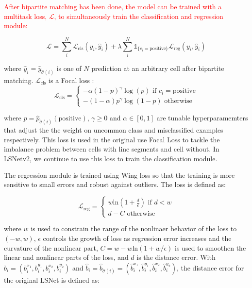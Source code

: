 \documentclass[journal]{IEEEtran}
\begin{document}
\textcolor{red}{After bipartite matching has been done, the model can be trained with a multitask loss, $\mathcal{L}$, to simultaneously train the classification and regression module:}

\begin{equation} \label{multitask_training_loss}
\mathcal{L} = \sum_i^N\mathcal{L}_{\text{cls}}(y_i, \hat{y}_i) + \lambda \sum_i^N\mathds{1}_{\{c_i=\text{positive}\}}\mathcal{L}_\text{reg}(y_i, \hat{y}_i) 
\end{equation}

where $\hat{y}_i = \hat{y}_{\hat{\sigma}(i)}$ is one of $N$ prediction at an arbitrary cell after bipartite matching. $\mathcal{L}_{\text{cls}}$ is a Focal loss \cite{focal_loss}:
\begin{equation}
  \mathcal{L}_{\text{cls}} =
    \begin{cases}
      -\alpha (1 - p)^\gamma \log(p) \text{  if  } c_i=\text{positive} \\
      -(1 - \alpha)p^\gamma \log(1-p) \text{  otherwise} 
    \end{cases}       
\end{equation}

where $p=\hat{p}_{\hat{\sigma}(i)}(\text{positive})$, $\gamma \geq 0$ and $\alpha \in [0, 1]$ are tunable hyperparamemters that adjust the the weight on uncommon class and misclassified examples respectively. This loss is used in the original use Focal Loss to tackle the imbalance problem between cells with line segments and cell without. In LSNetv2, we continue to use this loss to train the classification module.

The regression module is trained using Wing loss \cite{wing_loss} so that the training is more sensitive to small errors and robust against outliers. The loss is defined as:

\begin{equation}
  \mathcal{L}_{\text{reg}} =
    \begin{cases}
      w \text{ln} (1 + \frac{d}{\epsilon}) \text{ if } d < w \\
      d - C \text{  otherwise}
    \end{cases}       
\end{equation}

where $w$ is used to constrain the range of the nonlinaer behavior of the loss to $(-w, w)$, $\epsilon$ controls the growth of loss as regression error increases and the curvature of the nonlinear part, $C = w - w\text{ln}(1 + w / \epsilon)$ is used to smoothen the linear and nonlinear parts of the loss, and $d$ is the distance error. With $b_i = (b_i^{x_1}, b_i^{y_1}, b_i^{x_2}, b_i^{y_2})$ and $\hat{b}_i = \hat{b}_{\hat{\sigma}(i)} = (\hat{b}_i^{x_1}, \hat{b}_i^{y_1}, \hat{b}_i^{x_2}, \hat{b}_i^{y_2})$, the distance error for the original LSNet is defined as:
\end{document}
